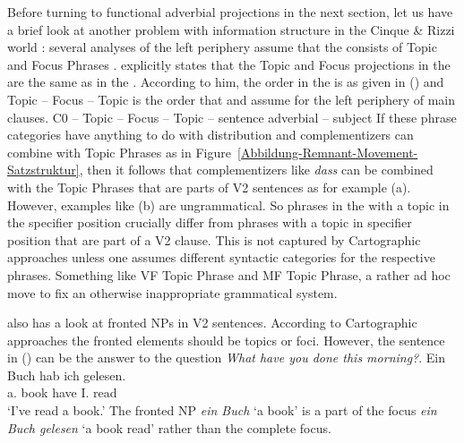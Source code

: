Before turning to functional adverbial projections in the next section, let us have a brief look at
another problem with information structure in the Cinque \& Rizzi world \citep[]{Rizzi97a-u}: several analyses of the left
periphery assume that the \vf consists of Topic and Focus Phrases \parencites[,
240]{Grewendorf2002a}[, 93]{Grewendorf2005a-u}{Grewendorf2009a}. \citet[]{Grewendorf2005a-u} explicitly states that the Topic and Focus projections in the \mf are the same
as in the \vf. According to him, the order in the \mf is as given in () and Topic – Focus –
Topic is the order that \citet[]{Rizzi97a-u} and \citet[]{Grewendorf2002a} assume for the left periphery of
main clauses. 
\ea
C0 – Topic – Focus – Topic – sentence adverbial – subject
\z
\largerpage[2]
If these phrase categories have anything to do with distribution and complementizers can combine with
Topic Phrases as in Figure~\ref{Abbildung-Remnant-Movement-Satzstruktur}, then it follows that
complementizers like \emph{dass} can be combined with the Topic Phrases that are parts of V2 sentences as for
example (a). However, examples like (b) are ungrammatical.
\eal
{}
\zl
So phrases in the \mf with a topic in the specifier position crucially differ from phrases with a
topic in specifier position that are part of a V2 clause. This is not captured by Cartographic approaches unless one assumes
different syntactic categories for the respective phrases. Something like VF Topic Phrase and MF
Topic Phrase, a rather ad hoc move to fix an otherwise inappropriate grammatical system. 

\citet{Fanselow2006a} also has a look at fronted NPs in V2 sentences. According to Cartographic
approaches the fronted elements should be topics or foci. However, the sentence in () can be
the answer to the question \emph{What have you done this morning?}.
\ea
\gll Ein Buch hab  ich gelesen.\\
     a.\ACC{}   book have I.\NOM{}   read\\\german
\glt `I've read a book.'
\z
The fronted NP \emph{ein Buch} `a book' is a part of the focus \emph{ein Buch gelesen} `a book read'
rather than the complete focus. 

